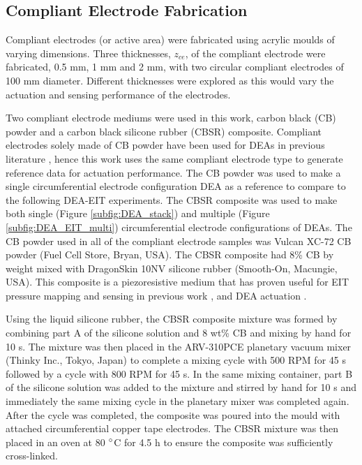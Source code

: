 \subsection{Compliant Electrode Fabrication}
\label{subsec:dea_elec_fab}
Compliant electrodes (or active area) were fabricated using acrylic moulds of varying dimensions. Three thicknesses, $z_{ce}$, of the compliant electrode were fabricated, 0.5 mm, 1 mm and 2 mm, with two circular compliant electrodes of 100 mm diameter. Different thicknesses were explored as this would vary the actuation and sensing performance of the electrodes.

Two compliant electrode mediums were used in this work, carbon black (CB) powder and a carbon black silicone rubber (CBSR) composite. Compliant electrodes solely made of CB powder have been used for DEAs in previous literature \cite{Carpi2015, Huang2022, Shigemune2018} , hence this work uses the same compliant electrode type to generate reference data for actuation performance. The CB powder was used to make a single circumferential electrode configuration DEA as a reference to compare to the following DEA-EIT experiments. The CBSR composite was used to make both single (Figure \ref{subfig:DEA_stack}) and multiple (Figure \ref{subfig:DEA_EIT_multi}) circumferential electrode configurations of DEAs. The CB powder used in all of the compliant electrode samples was Vulcan XC-72 CB powder (Fuel Cell Store, Bryan, USA). The CBSR composite had 8\% CB by weight mixed with DragonSkin 10NV silicone rubber (Smooth-On, Macungie, USA). This composite is a piezoresistive medium that has proven useful for EIT pressure mapping and sensing in previous work \cite{Ellingham2024} , and DEA actuation \cite{Carpi2015, Huang2022} .

Using the liquid silicone rubber, the CBSR composite mixture was formed by combining part A of the silicone solution and 8 wt\% CB and mixing by hand for 10 s. The mixture was then placed in the ARV-310PCE planetary vacuum mixer (Thinky Inc., Tokyo, Japan) to complete a mixing cycle with 500 RPM for 45 s followed by a cycle with 800 RPM for 45 s. In the same mixing container, part B of the silicone solution was added to the mixture and stirred by hand for 10 s and immediately the same mixing cycle in the planetary mixer was completed again. After the cycle was completed, the composite was poured into the mould with attached circumferential copper tape electrodes. The CBSR mixture was then placed in an oven at 80 $\degree$C for 4.5 h to ensure the composite was sufficiently cross-linked.

